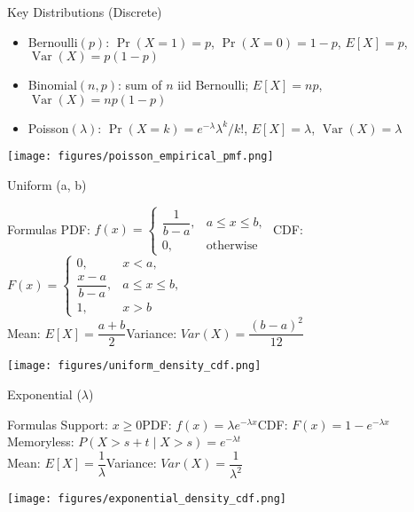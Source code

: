\documentclass{beamer}
\def\P{P}%
\def\E{E}%
\def\Var{Var}%
\def\mathbb#1{#1}%
\renewcommand{\P}{\mathbb{P}}
\newcommand{\E}{\mathbb{E}}
\newcommand{\Var}{\operatorname{Var}}
\newcommand{\1}{\mathbf{1}}
\begin{document}
\begin{frame}{Key Distributions (Discrete)}
  \small
  \begin{itemize}
    \item Bernoulli$(p)$: $\Pr(X=1)=p$, $\Pr(X=0)=1-p$, $\mathbb{E}[X]=p$, $\operatorname{Var}(X)=p(1-p)$
    \item Binomial$(n,p)$: sum of $n$ iid Bernoulli; $\mathbb{E}[X]=np$, $\operatorname{Var}(X)=np(1-p)$
    \item Poisson$(\lambda)$: $\Pr(X=k)=e^{-\lambda}\lambda^k/k!$, $\mathbb{E}[X]=\lambda$, $\operatorname{Var}(X)=\lambda$
  \end{itemize}
  \begin{center}
    \texttt{[image: figures/poisson\_empirical\_pmf.png]}
  \end{center}
\end{frame}

\begin{frame}{Uniform (a, b)}{}
  {
    \footnotesize
    \begin{block}{Formulas}
      PDF: $f(x)=
      \begin{cases}\dfrac{1}{b-a}, & a\le x\le b,\\ 0, & \text{otherwise}
      \end{cases}$\quad
      CDF: $F(x)=
      \begin{cases}0, & x<a,\\ \dfrac{x-a}{b-a}, & a\le x\le b,\\ 1, & x>b
      \end{cases}$\\[0.4em]
      Mean: $\E[X]=\dfrac{a+b}{2}$\quad Variance: $\Var(X)=\dfrac{(b-a)^2}{12}$
    \end{block}
  }
  \begin{center}
    \texttt{[image: figures/uniform\_density\_cdf.png]}
  \end{center}
\end{frame}

\begin{frame}{Exponential (\texorpdfstring{$\lambda$}{lambda})}{}
  {
    \small
    \begin{block}{Formulas}
      Support: $x\ge 0$\quad PDF: $f(x)=\lambda e^{-\lambda x}$\quad CDF: $F(x)=1-e^{-\lambda x}$\\[0.4em]
      Memoryless: $\P(X>s+t\mid X>s)=e^{-\lambda t}$ \\[0.4em]
      Mean: $\E[X]=\dfrac{1}{\lambda}$\quad Variance: $\Var(X)=\dfrac{1}{\lambda^2}$
  \end{block}}
  \begin{center}
    \texttt{[image: figures/exponential\_density\_cdf.png]}
  \end{center}
\end{frame}
\end{document}
